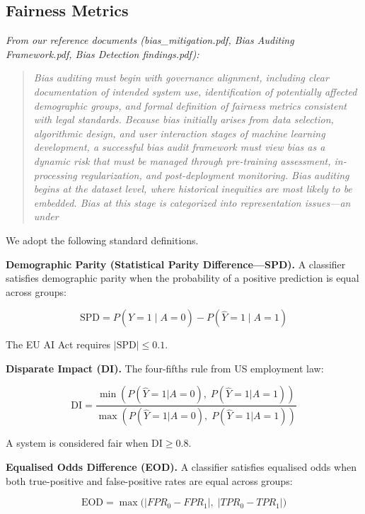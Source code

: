 \documentclass[conference]{IEEEtran}
\begin{document}
\subsection{Fairness Metrics}

\textit{From our reference documents (bias\_mitigation.pdf, Bias Auditing Framework.pdf, Bias Detection findings.pdf):}

\begin{quote}
\textit{Bias auditing must begin with governance alignment, including clear documentation of intended system use, identification of potentially affected demographic groups, and formal definition of fairness metrics consistent with legal standards. Because bias initially arises from data selection, algorithmic design, and user interaction stages of machine learning development, a successful bias audit framework must view bias as a dynamic risk that must be managed through pre-training assessment, in-processing regularization, and post-deployment monitoring. Bias auditing begins at the dataset level, where historical inequities are most likely to be embedded. Bias at this stage is categorized into representation issues—an under}
\end{quote}

We adopt the following standard definitions.

\textbf{Demographic Parity (Statistical Parity Difference---SPD).} A classifier satisfies demographic parity when the probability of a positive prediction is equal across groups:

\begin{equation}
\mathrm{SPD} = P(\hat{Y}=1 \mid A=0) - P(\hat{Y}=1 \mid A=1)
\end{equation}

The EU AI Act requires $|\mathrm{SPD}| \leq 0.1$.

\textbf{Disparate Impact (DI).} The four-fifths rule from US employment law:

\begin{equation}
\mathrm{DI} = \frac{\min(P(\hat{Y}=1|A=0),\; P(\hat{Y}=1|A=1))}
          {\max(P(\hat{Y}=1|A=0),\; P(\hat{Y}=1|A=1))}
\end{equation}

A system is considered fair when $\mathrm{DI} \geq 0.8$.

\textbf{Equalised Odds Difference (EOD).} A classifier satisfies equalised odds when both true-positive and false-positive rates are equal across groups:

\begin{equation}
\mathrm{EOD} = \max\bigl(|FPR_0 - FPR_1|,\; |TPR_0 - TPR_1|\bigr)
\end{equation}
\end{document}
